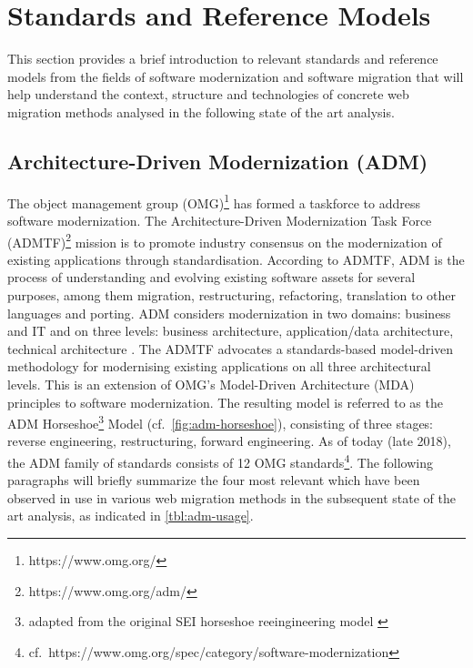 \hypertarget{standards-and-reference-models}{%
\section{Standards and Reference Models}\label{standards-and-reference-models}}

This section provides a brief introduction to relevant standards and reference models from the fields of software modernization and software migration that will help understand the context, structure and technologies of concrete web migration methods analysed in the following state of the art analysis.

\hypertarget{sec:adm}{%
\subsection{Architecture-Driven Modernization (ADM)}\label{sec:adm}}

The object management group (OMG)\footnote{https://www.omg.org/} has formed a taskforce to address software modernization.
The Architecture-Driven Modernization Task Force (ADMTF)\footnote{https://www.omg.org/adm/} mission is to promote industry consensus on the modernization of existing applications through standardisation.
According to ADMTF, ADM is the process of understanding and evolving existing software assets for several purposes, among them migration, restructuring, refactoring, translation to other languages and porting.
ADM considers modernization in two domains: business and IT and on three levels: business architecture, application/data architecture, technical architecture \autocite{OMG2008ADMWhitepaper}.
The ADMTF advocates a standards-based model-driven methodology for modernising existing applications on all three architectural levels.
This is an extension of OMG's Model-Driven Architecture (MDA) \autocite{OMG2014MDA} principles to software modernization.
The resulting model is referred to as the ADM Horseshoe\footnote{adapted from the original SEI horseshoe reeingineering model \autocite{Kazman1998Horseshoe}} Model \autocite{Perez-Castillo2011KDM,Perez-Castillo2011MARBLE,Khusidman2007} (cf.~\cref{fig:adm-horseshoe}), consisting of three stages: reverse engineering, restructuring, forward engineering.
As of today (late 2018), the ADM family of standards consists of 12 OMG standards\footnote{cf.~https://www.omg.org/spec/category/software-modernization}.
The following paragraphs will briefly summarize the four most relevant which have been observed in use in various web migration methods in the subsequent state of the art analysis, as indicated in \cref{tbl:adm-usage}.

